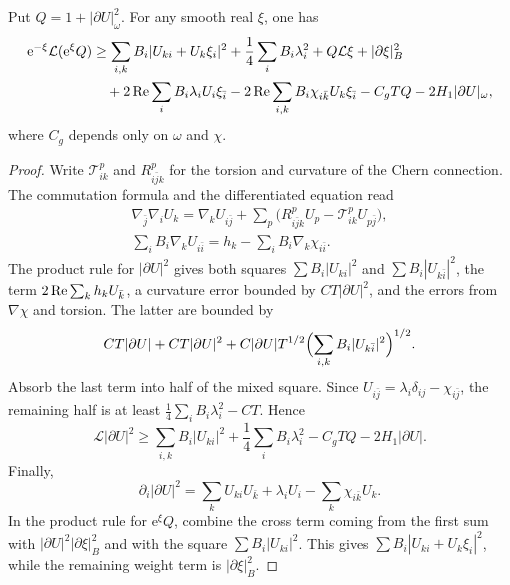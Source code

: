 \begin{lemma}\label{lem:concave-weighted-gradient}
Put $Q=1+|\partial U|_\omega^2$. For any smooth real $\xi$, one has
\begin{align*}
 \mathrm e^{-\xi}\mathcal L(\mathrm e^\xi Q)
 &\geq\sum_{i,k}B_i|U_{ki}+U_k\xi_i|^2
       +\frac14\sum_iB_i\lambda_i^2+Q\mathcal L\xi+|\partial\xi|_B^2\\
 &\quad+2\operatorname{Re}\sum_iB_i\lambda_iU_i\xi_{\bar i}
       -2\operatorname{Re}\sum_{i,k}B_i\chi_{i\bar k}U_k\xi_{\bar i}
       -C_gTQ-2H_1|\partial U|_\omega,
\end{align*}
where $C_g$ depends only on $\omega$ and $\chi$.
\end{lemma}
\begin{proof}
Write $\mathscr T^p_{ik}$ and $R^p_{i\bar jk}$ for the torsion and curvature of the Chern connection. The commutation formula and the differentiated equation read
\begin{gather*}
 \nabla_{\bar j}\nabla_iU_k
 =\nabla_kU_{i\bar j}+\sum_p\bigl(R^p_{i\bar jk}U_p-\mathscr T^p_{ik}U_{p\bar j}\bigr),\\
 \sum_iB_i\nabla_kU_{i\bar i}=h_k-\sum_iB_i\nabla_k\chi_{i\bar i}.
\end{gather*}
The product rule for $|\partial U|^2$ gives both squares $\sum B_i|U_{ki}|^2$ and $\sum B_i|U_{k\bar i}|^2$, the term $2\operatorname{Re}\sum_kh_kU_{\bar k}$, a curvature error bounded by $CT|\partial U|^2$, and the errors from $\nabla\chi$ and torsion. The latter are bounded by
\[
 CT|\partial U|+CT|\partial U|^2
 +C|\partial U|T^{1/2}\Bigl(\sum_{i,k}B_i|U_{k\bar i}|^2\Bigr)^{1/2}.
\]
Absorb the last term into half of the mixed square. Since $U_{i\bar j}=\lambda_i\delta_{ij}-\chi_{i\bar j}$, the remaining half is at least $\frac14\sum_iB_i\lambda_i^2-CT$. Hence
\[
 \mathcal L|\partial U|^2\geq\sum_{i,k}B_i|U_{ki}|^2
 +\frac14\sum_iB_i\lambda_i^2-C_gTQ-2H_1|\partial U|.
\]
Finally,
\[
 \partial_i|\partial U|^2
 =\sum_kU_{ki}U_{\bar k}+\lambda_iU_i-\sum_k\chi_{i\bar k}U_k.
\]
In the product rule for $\mathrm e^\xi Q$, combine the cross term coming from the first sum with $|\partial U|^2|\partial\xi|_B^2$ and with the square $\sum B_i|U_{ki}|^2$. This gives $\sum B_i|U_{ki}+U_k\xi_i|^2$, while the remaining weight term is $|\partial\xi|_B^2$.
\end{proof}


